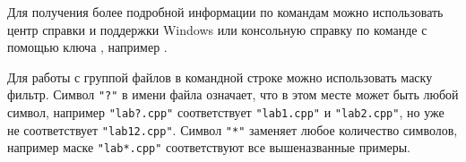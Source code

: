 \documentclass[a4paper,12pt]{article}
\begin{document}
    \begin{flushleft}
    Для получения более подробной информации по командам можно использовать центр справки и поддержки Windows или консольную справку по команде с помощью ключа , например .
    \end{flushleft}
  
    \begin{flushleft}
    Для работы с группой файлов в командной строке можно использовать маску фильтр. Символ \texttt{"?"} в имени файла означает, что в этом месте может быть любой символ, например \texttt{"lab?.cpp"} соответствует \texttt{"lab1.cpp"} и \texttt{"lab2.cpp"}, но уже не соответствует \texttt{"lab12.cpp"}. Символ \texttt{"*"} заменяет любое количество символов, например маске \texttt{"lab*.cpp"} соответствуют все вышеназванные примеры.
    \end{flushleft}

    \newpage
\end{document}
